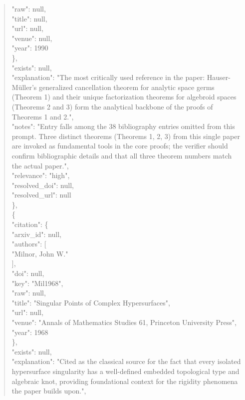 \documentclass[11pt]{article}
\begin{document}
\begin{quote}
        "raw": null,\\
        "title": null,\\
        "url": null,\\
        "venue": null,\\
        "year": 1990\\
      \},\\
      "exists": null,\\
      "explanation": "The most critically used reference in the paper: Hauser-Müller's generalized cancellation theorem for analytic space germs (Theorem 1) and their unique factorization theorems for algebroid spaces (Theorems 2 and 3) form the analytical backbone of the proofs of Theorems 1 and 2.",\\
      "notes": "Entry falls among the 38 bibliography entries omitted from this prompt. Three distinct theorems (Theorems 1, 2, 3) from this single paper are invoked as fundamental tools in the core proofs; the verifier should confirm bibliographic details and that all three theorem numbers match the actual paper.",\\
      "relevance": "high",\\
      "resolved\_doi": null,\\
      "resolved\_url": null\\
    \},\\
    \{\\
      "citation": \{\\
        "arxiv\_id": null,\\
        "authors": [\\
          "Milnor, John W."\\
        ],\\
        "doi": null,\\
        "key": "Mil1968",\\
        "raw": null,\\
        "title": "Singular Points of Complex Hypersurfaces",\\
        "url": null,\\
        "venue": "Annals of Mathematics Studies 61, Princeton University Press",\\
        "year": 1968\\
      \},\\
      "exists": null,\\
      "explanation": "Cited as the classical source for the fact that every isolated hypersurface singularity has a well-defined embedded topological type and algebraic knot, providing foundational context for the rigidity phenomena the paper builds upon.",\\

\end{quote}
\end{document}
